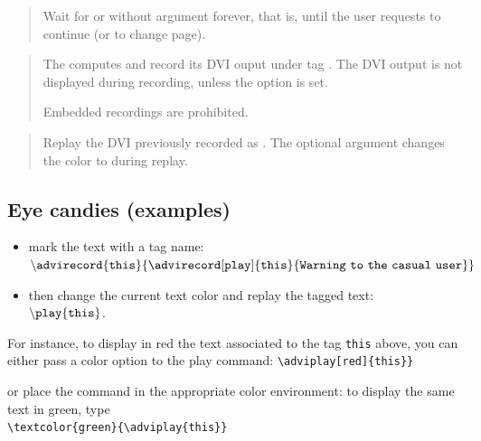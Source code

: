 \documentclass[12pt]{article}
\begin{document}
\medskip\noindent
\docdef \adviwait{}
\begin{quote}
Wait for  or without argument forever, that is, until the
user requests to continue (or to change page).
\end{quote}

\medskip\noindent
\docdef \advirecord \doctt{[play]}
\begin{quote}
The computes  and record its DVI ouput under tag
. The DVI output is not displayed during recording, unless the
option  is set.

Embedded recordings are prohibited. 
\end{quote}

\medskip\noindent
\docdef \adviplay{}
\begin{quote}
Replay the DVI previously recorded as .
The optional argument changes the color to  during replay. 
\end{quote}

\newpage 

\subsection* {Eye candies (examples)}

\begin{itemize}
   \item mark the text with a tag name:\\
     $\tt \backslash advirecord\{this\}
      \{\advirecord[play]{this}{Warning~to~the~casual~user}\}$

   \item then change the current text color and replay the tagged text:\\
  $\tt{\backslash}play\{this\}$.
\end{itemize}


\noindent
For instance, to display in red the text associated to the tag
{\tt this} above, you can either pass a color option to the play command:
\verb+\adviplay[red]{this}}+\\
\adviwait%
\textcolor {c1}{}\adviwait
{}\adviwait

\noindent
or place the command in the appropriate color environment:
to display the same text in green, type\\
\verb+\textcolor{green}{\adviplay{this}}+\\
\adviwait
\textcolor{green}{\adviwait}
\end{document}
